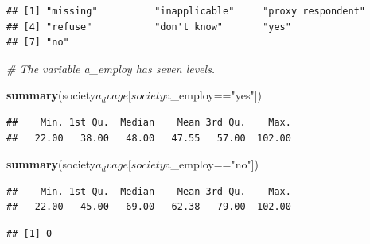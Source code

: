 \documentclass[]{article}
\newenvironment{Shaded}{\begin{snugshade}}{\end{snugshade}}
\newcommand{\KeywordTok}[1]{\textcolor[rgb]{0.13,0.29,0.53}{\textbf{{#1}}}}
\newcommand{\StringTok}[1]{\textcolor[rgb]{0.31,0.60,0.02}{{#1}}}
\newcommand{\CommentTok}[1]{\textcolor[rgb]{0.56,0.35,0.01}{\textit{{#1}}}}
\newcommand{\NormalTok}[1]{{#1}}
\begin{document}
\begin{verbatim}
## [1] "missing"          "inapplicable"     "proxy respondent"
## [4] "refuse"           "don't know"       "yes"             
## [7] "no"
\end{verbatim}

\begin{Shaded}
\begin{Highlighting}[]
\CommentTok{# The variable a_employ has seven levels.}

\KeywordTok{summary}\NormalTok{(society$a_dvage[society$a_employ==}\StringTok{"yes"}\NormalTok{])}
\end{Highlighting}
\end{Shaded}

\begin{verbatim}
##    Min. 1st Qu.  Median    Mean 3rd Qu.    Max. 
##   22.00   38.00   48.00   47.55   57.00  102.00
\end{verbatim}

\begin{Shaded}
\begin{Highlighting}[]
\KeywordTok{summary}\NormalTok{(society$a_dvage[society$a_employ==}\StringTok{"no"}\NormalTok{])}
\end{Highlighting}
\end{Shaded}

\begin{verbatim}
##    Min. 1st Qu.  Median    Mean 3rd Qu.    Max. 
##   22.00   45.00   69.00   62.38   79.00  102.00
\end{verbatim}

\begin{Shaded}
\end{Shaded}

\begin{verbatim}
## [1] 0
\end{verbatim}

\begin{Shaded}
\end{Shaded}
\end{document}
